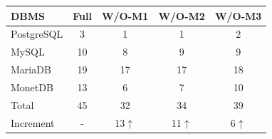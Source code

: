 \begin{tabular}{lcccc}
\toprule
DBMS & Full & W/O-M1 & W/O-M2 & W/O-M3 \\
\midrule
PostgreSQL & 3 & 1 & 1 & 2 \\
MySQL & 10 & 8 & 9 & 9 \\
MariaDB & 19 & 17 & 17 & 18 \\
MonetDB & 13 & 6 & 7 & 10 \\
\midrule
Total & 45 & 32 & 34 & 39 \\
Increment & - & 13$\uparrow$ & 11$\uparrow$ & 6$\uparrow$ \\
\bottomrule
\end{tabular}

